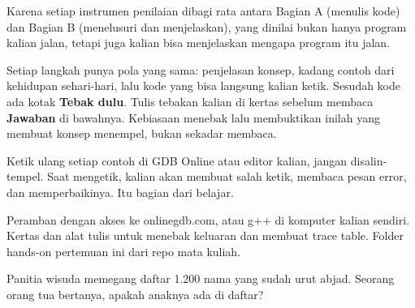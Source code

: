\documentclass[a4paper]{article}
\begin{document}
\par\vspace{4pt}\par\vspace{6pt}
Karena setiap instrumen penilaian dibagi rata antara Bagian A (menulis kode) dan Bagian B (menelusuri dan menjelaskan), yang dinilai bukan hanya program kalian jalan, tetapi juga kalian bisa menjelaskan mengapa program itu jalan.

Setiap langkah punya pola yang sama: penjelasan konsep, kadang contoh dari kehidupan sehari-hari, lalu kode yang bisa langsung kalian ketik. Sesudah kode ada kotak \textbf{Tebak dulu}. Tulis tebakan kalian di kertas sebelum membaca \textbf{Jawaban} di bawahnya. Kebiasaan menebak lalu membuktikan inilah yang membuat konsep menempel, bukan sekadar membaca.

\begin{Penting}
Ketik ulang setiap contoh di GDB Online atau editor kalian, jangan disalin-tempel. Saat mengetik, kalian akan membuat salah ketik, membaca pesan error, dan memperbaikinya. Itu bagian dari belajar.
\end{Penting}
Peramban dengan akses ke onlinegdb.com, atau g++ di komputer kalian sendiri. Kertas dan alat tulis untuk menebak keluaran dan membuat trace table. Folder hands-on pertemuan ini dari repo mata kuliah.

Panitia wisuda memegang daftar 1.200 nama yang sudah urut abjad. Seorang orang tua bertanya, apakah anaknya ada di daftar?
\end{document}
